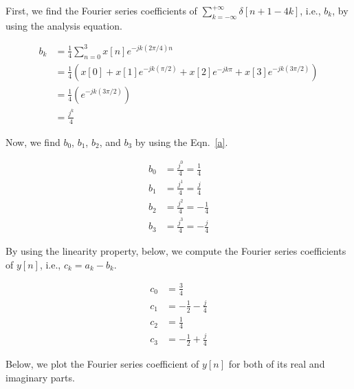\documentclass[10pt,a4paper, margin=1in]{article}
\begin{document}
\begin{enumerate}
\begin{enumerate}
\begin{itemize}
    First, we find the Fourier series coefficients of $\sum_{k = - \infty}^{+ \infty} \delta[n + 1 - 4k]$, i.e., $b_k$, by using the analysis equation.

    \begin{equation}\label{a}
    \begin{split}
    	b_k & = \frac{1}{4} \sum_{n = 0}^{3} x[n] e^{-jk(2\pi/4)n}\\
	       & = \frac{1}{4} \left( x[0] + x[1] e^{-jk(\pi/2)} + x[2]e^{-jk\pi} + x[3] e^{-jk(3\pi/2)} \right)\\
	       & = \frac{1}{4} \left( e^{-jk(3\pi/2)}\right)\\
	       & = \frac{j^k}{4}
    \end{split}
    \end{equation}
    
    Now, we find $b_0$, $b_1$, $b_2$, and $b_3$ by using the Eqn.~\ref{a}.
    
    \begin{equation}
    \begin{split}
    	b_0 & = \frac{j^0}{4} = \frac{1}{4}\\
    	b_1 & = \frac{j^1}{4} = \frac{j}{4}\\
    	b_2 & = \frac{j^2}{4} = -\frac{1}{4}\\
    	b_3 & = \frac{j^3}{4} = -\frac{j}{4}
    \end{split}
    \end{equation}
    
    By using the linearity property, below, we compute the Fourier series coefficients of $y[n]$, i.e., $c_k = a_k - b_k$.
    
    \begin{equation}
    \begin{split}
    	c_0 & = \frac{3}{4}\\
    	c_1 & = -\frac{1}{2} - \frac{j}{4}\\
    	c_2 & = \frac{1}{4}\\
    	c_3 & = -\frac{1}{2} + \frac{j}{4}
    \end{split}
    \end{equation}
    
    Below, we plot the Fourier series coefficient of $y[n]$ for both of its real and imaginary parts.
    

\end{itemize}
\end{enumerate}
\end{enumerate}
\end{document}
